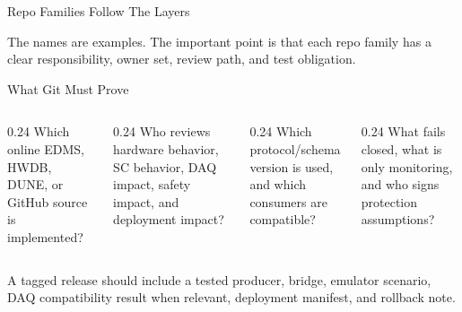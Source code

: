 \documentclass[aspectratio=169,10pt]{beamer}
\begin{document}
\begin{frame}{Repo Families Follow The Layers}
\centering
{}

\medskip
{}
  {The names are examples. The important point is that each repo family has a clear responsibility, owner set, review path, and test obligation.}
  {}
\end{frame}

\begin{frame}{What Git Must Prove}
\begin{columns}[T,onlytextwidth]
  \begin{column}{0.24\textwidth}
      {Which online EDMS, HWDB, DUNE, or GitHub source is implemented?}
      {}
  \end{column}
  \begin{column}{0.24\textwidth}
      {Who reviews hardware behavior, SC behavior, DAQ impact, safety impact, and deployment impact?}
      {}
  \end{column}
  \begin{column}{0.24\textwidth}
      {Which protocol/schema version is used, and which consumers are compatible?}
      {}
  \end{column}
  \begin{column}{0.24\textwidth}
      {What fails closed, what is only monitoring, and who signs protection assumptions?}
      {}
  \end{column}
\end{columns}
\medskip
{}
  {A tagged release should include a tested producer, bridge, emulator scenario, DAQ compatibility result when relevant, deployment manifest, and rollback note.}
  {}
\end{frame}
\end{document}
